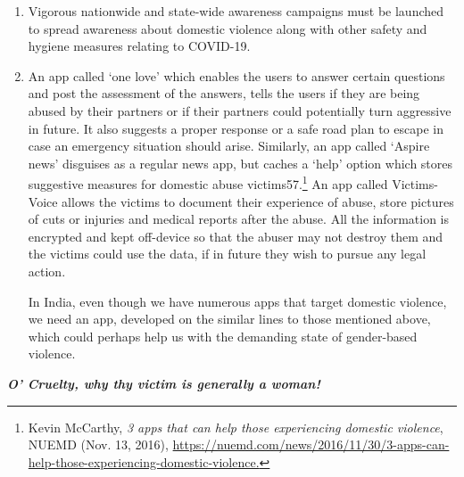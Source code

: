 \begin{multicols}{2}
\begin{enumerate}
\item Vigorous nationwide and state-wide awareness campaigns must be launched to spread
awareness about domestic violence along with other safety and hygiene measures
relating to COVID-19. 

\item An app called ‘one love’ which enables the users to answer certain questions and post
the assessment of the answers, tells the users if they are being abused by their partners
or if their partners could potentially turn aggressive in future. It also suggests a proper
response or a safe road plan to escape in case an emergency situation should arise.
Similarly, an app called ‘Aspire news’ disguises as a regular news app, but caches a
‘help’ option which stores suggestive measures for domestic abuse victims57.\footnote{Kevin McCarthy, \textit{3 apps that can help those experiencing domestic violence}, NUEMD (Nov. 13, 2016),
\url{https://nuemd.com/news/2016/11/30/3-apps-can-help-those-experiencing-domestic-violence.}} An app
called Victims-Voice allows the victims to document their experience of abuse, store
pictures of cuts or injuries and medical reports after the abuse. All the information is
encrypted and kept off-device so that the abuser may not destroy them and the victims
could use the data, if in future they wish to pursue any legal action.

In India, even though we have numerous apps that target domestic violence, we need
an app, developed on the similar lines to those mentioned above, which could perhaps
help us with the demanding state of gender-based violence.

\end{enumerate}


\noi
{\large\it\bfseries O’ Cruelty, why thy victim is generally a woman!}


\end{multicols}
